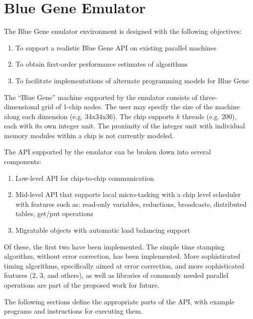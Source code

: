 
\section{Blue Gene Emulator}
\label{bgemulator}

The Blue Gene emulator environment is designed with the following
objectives:

\begin{enumerate}
\item To support a realistic Blue Gene API on existing parallel machines

\item To obtain first-order performance estimates of algorithms

\item To facilitate implementations of alternate programming models for
      Blue Gene
\end{enumerate}

The ``Blue Gene'' machine supported by the emulator consists of
three-dimensional grid of 1-chip nodes.  The user may specify the size
of the machine along each dimension (e.g. 34x34x36).  The chip supports
$k$ threads (e.g. 200), each with its own integer unit.  The proximity of
the integer unit with individual memory modules within a chip is not
currently modeled.

The API supported by the emulator can be broken down into several
components:

\begin{enumerate}
\item Low-level API for chip-to-chip communication
\item Mid-level API that supports local micro-tasking with a chip level
scheduler with features such as: read-only variables, reductions, broadcasts,
distributed tables, get/put operations
\item Migratable objects with automatic load balancing support
\end{enumerate}

Of these, the first two have been implemented.  The simple time stamping
algorithm, without error correction, has been implemented.  More
sophisticated timing algorithms, specifically aimed at error correction,
and more sophisticated features (2, 3, and others), as well as libraries
of commonly needed parallel operations are part of the proposed work for
future.

The following sections define the appropriate parts of the API, with
example programs and instructions for executing them.

